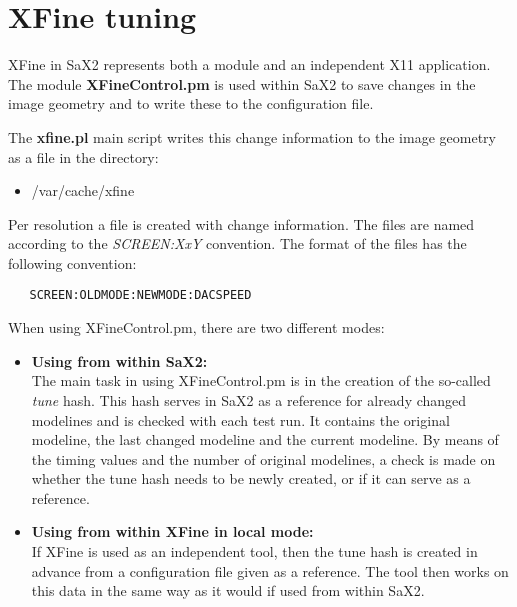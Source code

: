 \chapter{XFine tuning}
\label{cha:xfi}
\minitoc
XFine  in SaX2 represents both a module and an independent X11
application. The module \textbf{XFineControl.pm} is used within SaX2 to save
changes in the image geometry and to write these to the configuration file.

The \textbf{xfine.pl} main script writes this change information to the image
geometry as a file in the directory:
\begin{itemize}
\item /var/cache/xfine
\end{itemize}
Per resolution a file is created with change information. The files are named
according to the \textit{SCREEN:XxY} convention.
The format of the files has the following convention:
\begin{verbatim}
   SCREEN:OLDMODE:NEWMODE:DACSPEED
\end{verbatim}

When using XFineControl.pm, there are two different modes:
\begin{itemize}
\item \textbf{Using from within SaX2:}\\
      The main task in using XFineControl.pm is in the creation of the
      so-called \textit{tune} hash. This hash serves in SaX2 as a reference
      for already changed modelines and is checked with each test run. It
      contains the original modeline, the last changed modeline and the
      current modeline. By means of the timing values and the number of
      original modelines, a check is made on whether the tune hash needs to be
      newly created, or if it can serve as a reference. 

\item \textbf{Using from within XFine in local mode:}\\
      If XFine is used as an independent tool, then the tune hash is created
      in advance from a configuration file given as a reference. The tool then
      works on this data in the same way as it would if used from within SaX2.
\end{itemize}

